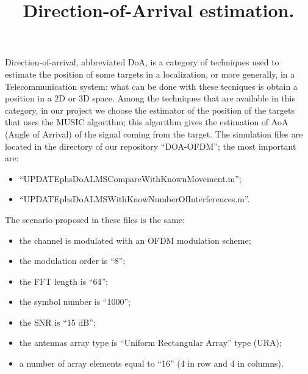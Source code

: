 \documentclass[a4paper,10pt]{article}
\title{}
\author{}
\begin{document}
\maketitle
\title{Direction-of-Arrival estimation.}
\begin{Direction-of-Arrival estimation.}
    
\end{Direction-of-Arrival estimation.}
Direction-of-arrival, abbreviated DoA, is a category of techniques used to estimate the position of some targets in a localization, or more generally, in a Telecommunication system: what can be done with these tecniques is obtain a position in a 2D or 3D space. Among the techniques that are available in this category, in our project we choose the estimator of the position of the targets that uses the MUSIC algorithm; this algorithm gives the estimation of AoA (Angle of Arrival) of the signal coming from the target. The simulation files are located in the directory of our repository “DOA-OFDM”; the most important are:
\begin{itemize}
    \item “UPDATEphsDoALMSCompareWithKnownMovement.m”;
    \item “UPDATEphsDoALMSWithKnowNumberOfInterferences.m”.
\end{itemize}

The scenario proposed in these files is the same:
\begin{itemize}
    \item the channel is modulated with an OFDM modulation scheme;
    \item the modulation order is “8”;
    \item the FFT length is “64”;
    \item the symbol number is “1000”;
    \item the SNR is “15 dB”;
    \item the antennas array type is “Uniform Rectangular Array” type (URA);
    \item a number of array elements equal to “16” (4 in row and 4 in columns).
\end{itemize}
\end{document}
